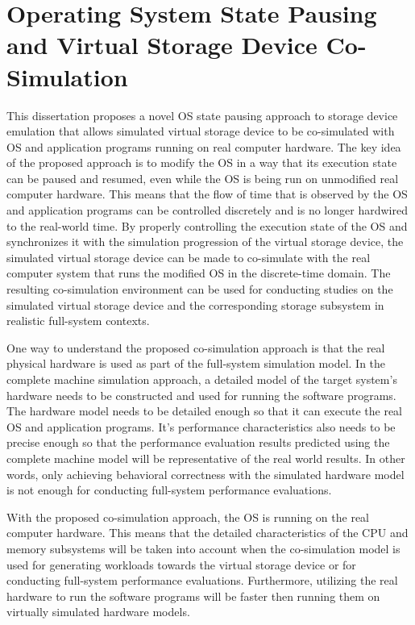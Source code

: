 \chapter[Operating System State Pausing and Virtual Storage Device \\ Co-Simulation]{Operating System State Pausing and Virtual Storage Device Co-Simulation}
\label{ch:3}

This dissertation proposes a novel OS state pausing approach to storage device emulation that allows simulated virtual storage device to be co-simulated with OS and application programs running on real computer hardware. The key idea of the proposed approach is to modify the OS in a way that its execution state can be paused and resumed, even while the OS is being run on unmodified real computer hardware. This means that the flow of time that is observed by the OS and application programs can be controlled discretely and is no longer hardwired to the real-world time. By properly controlling the execution state of the OS and synchronizes it with the simulation progression of the virtual storage device, the simulated virtual storage device can be made to co-simulate with the real computer system that runs the modified OS in the discrete-time domain. The resulting co-simulation environment can be used for conducting studies on the simulated virtual storage device and the corresponding storage subsystem in realistic full-system contexts.

One way to understand the proposed co-simulation approach is that the real physical hardware is used as part of the full-system simulation model. In the complete machine simulation approach, a detailed model of the target system's hardware needs to be constructed and used for running the software programs. The hardware model needs to be detailed enough so that it can execute the real OS and application programs. It's performance characteristics also needs to be precise enough so that the performance evaluation results predicted using the complete machine model will be representative of the real world results. In other words, only achieving behavioral correctness with the simulated hardware model is not enough for conducting full-system performance evaluations.

With the proposed co-simulation approach, the OS is running on the real computer hardware. This means that the detailed characteristics of the CPU and memory subsystems will be taken into account when the co-simulation model is used for generating workloads towards the virtual storage device or for conducting full-system performance evaluations. Furthermore, utilizing the real hardware to run the software programs will be faster then running them on virtually simulated hardware models.

